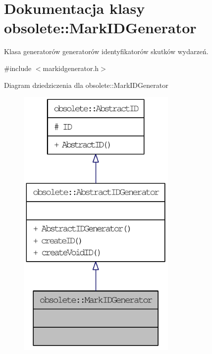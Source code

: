 \hypertarget{classobsolete_1_1MarkIDGenerator}{
\section{Dokumentacja klasy obsolete::MarkIDGenerator}
\label{classobsolete_1_1MarkIDGenerator}
}


Klasa generatorów generatorów identyfikatorów skutków wydarzeń.  




{\ttfamily \#include $<$markidgenerator.h$>$}



Diagram dziedziczenia dla obsolete::MarkIDGenerator\nopagebreak
\begin{figure}[H]
\begin{center}
\leavevmode
\includegraphics[width=218pt]{classobsolete_1_1MarkIDGenerator__inherit__graph}
\end{center}
\end{figure}


